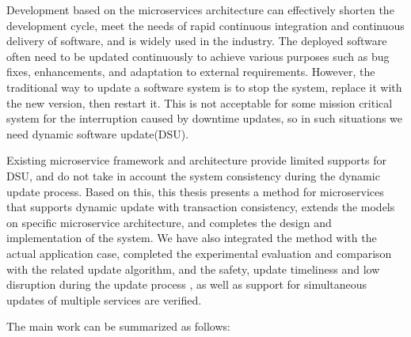 \documentclass[macfonts,master]{njuthesis}
\begin{document}
\begin{englishabstract}
Development based on the microservices architecture can effectively shorten the development cycle, meet the needs of rapid continuous integration and continuous delivery of software, and is widely used in the industry. The deployed software often need to be updated continuously to achieve various purposes such as bug fixes, enhancements, and adaptation to external requirements. However, the traditional way to update a software system is to stop the system, replace it with the new version, then restart it. This is not acceptable for some mission critical system for the interruption caused by downtime updates, so in such situations we need dynamic software update(DSU).

Existing microservice framework and architecture provide limited supports for DSU, and do not take in account the system consistency during the dynamic update process. Based on this, this thesis presents a method for microservices that supports dynamic update with transaction consistency, extends the models on specific microservice architecture, and completes the design and implementation of the system. We have also integrated the method with the actual application case, completed the experimental evaluation and comparison with the related update algorithm, and the safety, update timeliness and low disruption during the update process , as well as support for simultaneous updates of multiple services are verified. 

The main work can be summarized as follows: 


\end{englishabstract}
\end{document}
